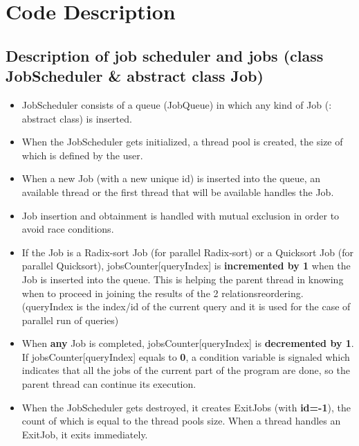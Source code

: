 \documentclass{ws-ijprai}
\begin{document}
\clearpage
\section{Code Description}
\subsection{Description of job scheduler and jobs (class JobScheduler & abstract class Job)}
\begin{itemize}
    \item JobScheduler consists of a queue (JobQueue) in which any kind of Job (: abstract class) is inserted.
    \item When the JobScheduler gets initialized, a thread pool is created, the size of which is defined by the user.
    \item When a new Job (with a new unique id) is inserted into the queue, an available thread or the first thread that will be available handles the Job.
    \item Job insertion and obtainment is handled with mutual exclusion in order to avoid race conditions.
    \item If the Job is a Radix-sort Job (for parallel Radix-sort) or a Quicksort Job (for parallel Quicksort), jobsCounter[queryIndex] is \textbf{incremented by 1} when the Job is inserted into the queue. This is helping the parent thread in knowing when to proceed in joining the results of the 2 relations\textquotesingle  reordering. (queryIndex is the index/id of the current query and it is used for the case of parallel run of queries)
    \item When \textbf{any} Job is completed, jobsCounter[queryIndex] is \textbf{decremented by 1}. If jobsCounter[queryIndex] equals to \textbf{0}, a condition variable is signaled which indicates that all the jobs of the current part of the program are done, so the parent thread can continue its execution.
    \item When the JobScheduler gets destroyed, it creates ExitJobs (with \textbf{id=-1}), the count of which is equal to the thread pool\textquotesingle s size. When a thread handles an ExitJob, it exits immediately.
\end{itemize}
\end{document}
